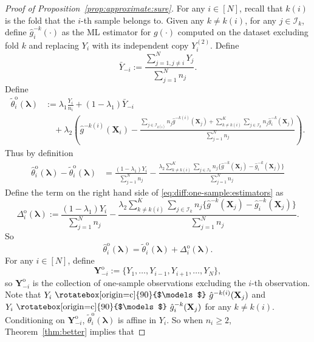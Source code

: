 \documentclass[12pt,letterpaper]{article}
\newcommand{\indep}{\ \raisebox{0.05em}{\rotatebox[origin=c]{90}{$\models$}} \ }
\begin{document}
\begin{proof}[Proof of Proposition~\ref{prop:approximate:sure}]
For any $i\in[N]$, recall that $k(i)$ is the fold that the $i$-th sample belongs to. Given any $k\neq k(i)$, for any $j\in\mathcal{I}_{k}$, define $\hat{g}_i^{-k}(\cdot)$ as the ML estimator for $g(\cdot)$ computed on the dataset excluding fold $k$ and replacing $Y_i$ with its independent copy $Y_i^{(2)}$. Define 
$$\bar{Y}_{-i}:=\frac{\sum_{j=1,j\neq i}^NY_j}{\sum_{j=1}^Nn_j}.$$  
Define 
$$\begin{array}{rl}
\tilde\theta_i^{\mathrm{o}}(\boldsymbol{\lambda})\!\!\!\!&\displaystyle:=\lambda_1\frac{Y_i}{n_i} + (1-\lambda_1)\bar{Y}_{-i}\\
&\displaystyle\quad+\lambda_2\left(\hat{g}^{-k(i)}(\mathbf{X}_i)-\frac{\sum_{j\in\mathcal{I}_{k(i)}}n_j\hat{g}^{-k(i)}(\mathbf{X}_j)+\sum_{k\neq k(i)}^K\sum_{j\in\mathcal{I}_k}n_j\hat{g}_{i}^{-k}(\mathbf{X}_{j})}{\sum_{j=1}^Nn_j}\right).
\end{array}$$
Thus by definition
\begin{equation}\label{eq:diff:one-sample:estimators}
\begin{array}{rl}
\hat{\theta}_i^{\mathrm{o}}(\boldsymbol{\lambda})- \tilde{\theta}_i^{\mathrm{o}}(\boldsymbol{\lambda})\!\!\!\!&\displaystyle=\frac{(1-\lambda_1)Y_i}{\sum_{j=1}^Nn_j}-\frac{\lambda_2\sum_{k\neq k(i)}^K\sum_{j\in\mathcal{I}_k}n_j\{\hat{g}^{-k}(\mathbf{X}_j)-\hat{g}_{i}^{-k}(\mathbf{X}_j)\}}{\sum_{j=1}^Nn_j}
\end{array}
\end{equation}
Define the term on the right hand side of \eqref{eq:diff:one-sample:estimators} as 
\begin{equation}\label{eq:Delta:lambda:one-sample}
\Delta_i^{\mathrm{o}}(\boldsymbol{\lambda}):=\frac{(1-\lambda_1)Y_i}{\sum_{j=1}^Nn_j}-\frac{\lambda_2\sum_{k\neq k(i)}^K\sum_{j\in\mathcal{I}_k}n_j\{\hat{g}^{-k}(\mathbf{X}_j)-\hat{g}_{i}^{-k}(\mathbf{X}_j)\}}{\sum_{j=1}^Nn_j}.
\end{equation}
So 
\begin{equation}\label{eq:theta:hat:lambda}
\hat{\theta}_i^{\mathrm{o}}(\boldsymbol{\lambda})=\tilde{\theta}_i^{\mathrm{o}}(\boldsymbol{\lambda})+\Delta_i^{\mathrm{o}}(\boldsymbol{\lambda}).
\end{equation}
For any $i\in[N]$, define
$$\mathbf{Y}_{-i}^{\mathrm{o}}:=\{Y_1,\ldots,Y_{i-1},Y_{i+1},\ldots,Y_N\},$$ 
so $\mathbf{Y}_{-i}^{\mathrm{o}}$ is the collection of one-sample observations excluding the $i$-th observation. Note that $Y_i\indep\hat{g}^{-k(i)}(\mathbf{X}_j)$ and $Y_i\indep\hat{g}_{i}^{-k}(\mathbf{X}_j)$ for any $k\neq k(i)$. Conditioning on $\mathbf{Y}_{-i}^{\mathrm{o}}$, $\tilde{\theta}_i^{\mathrm{o}}(\boldsymbol{\lambda})$ is affine in $Y_i$. So when $n_i\geq2$, Theorem~\ref{thm:better} implies that 

\end{proof}
\end{document}
